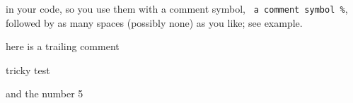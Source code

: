 in your code, so you use them with a comment symbol, \lstinline! a comment symbol %!, followed
by as many spaces (possibly none) as you like; see
example.
 
here is a trailing comment %

tricky test %

and the number 5
